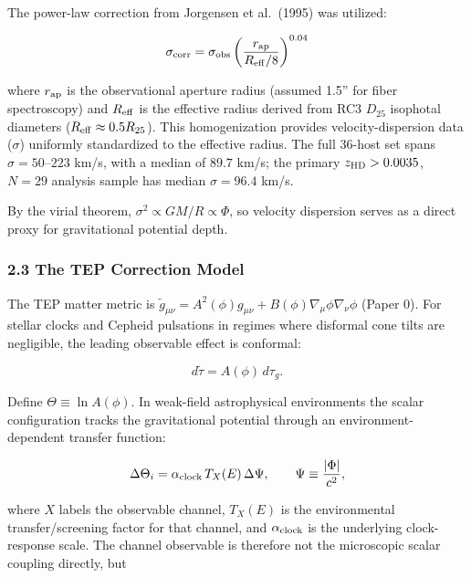 \documentclass[
]{article}
\begin{document}
The power-law correction from Jorgensen et al.~(1995) was utilized:

\begin{equation}
\sigma_{\rm corr} = \sigma_{\rm obs} \left( \frac{r_{\rm ap}}{R_{\rm eff}/8} \right)^{0.04}
\end{equation}

where \(r_{\rm ap}\) is the observational aperture radius (assumed 1.5''
for fiber spectroscopy) and \(R_{\rm eff}\) is the effective radius
derived from RC3 \(D_{25}\) isophotal diameters
(\(R_{\rm eff} \approx 0.5 R_{25}\)). This homogenization provides
velocity-dispersion data (\(\sigma\)) uniformly standardized to the
effective radius. The full 36-host set spans \(\sigma = 50\)--\(223\)
km/s, with a median of \(89.7\) km/s; the primary \(z_{\rm HD}>0.0035\),
\(N=29\) analysis sample has median \(\sigma=96.4\) km/s.

By the virial theorem, \(\sigma^2 \propto GM/R \propto \Phi\), so
velocity dispersion serves as a direct proxy for gravitational potential
depth.

\subsubsection{2.3 The TEP Correction
Model}\label{the-tep-correction-model}

The TEP matter metric is
\(\tilde g_{\mu\nu} = A^2(\phi)g_{\mu\nu} + B(\phi)\nabla_\mu\phi\nabla_\nu\phi\)
(Paper 0). For stellar clocks and Cepheid pulsations in regimes where
disformal cone tilts are negligible, the leading observable effect is
conformal:

\begin{equation}
d\tilde\tau = A(\phi)\,d\tau_g .
\end{equation}

Define \(\Theta \equiv \ln A(\phi)\). In weak-field astrophysical
environments the scalar configuration tracks the gravitational potential
through an environment-dependent transfer function:

\begin{equation}
\Delta\Theta_i = \alpha_{\rm clock}\,T_X(E)\,\Delta\Psi ,
\qquad \Psi \equiv \frac{|\Phi|}{c^2},
\end{equation}

where \(X\) labels the observable channel, \(T_X(E)\) is the
environmental transfer/screening factor for that channel, and
\(\alpha_{\rm clock}\) is the underlying clock-response scale. The
channel observable is therefore not the microscopic scalar coupling
directly, but
\end{document}
